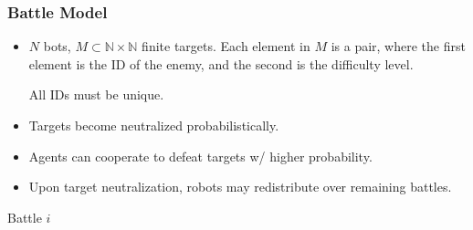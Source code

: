 \documentclass{beamer}
\theoremstyle{definition}
\begin{document}
\begin{frame}
    \frametitle{Battle Model}

    \begin{itemize}
        \item
            $N$ bots, $M \subset \mathbb{N} \times \mathbb{N} $ finite targets.
            Each element in $ M $ is a pair, where the first element is
            the ID of the enemy, and the second is the difficulty level.

            All IDs must be unique.
        \item
            Targets become neutralized probabilistically.
        \item
            Agents can cooperate to defeat targets w/ higher probability.
        \item
            Upon target neutralization, robots may redistribute over
            remaining battles.
    \end{itemize}

    \begin{center}

        Battle $ i $
    \end{center}
\end{frame}



\end{document}
